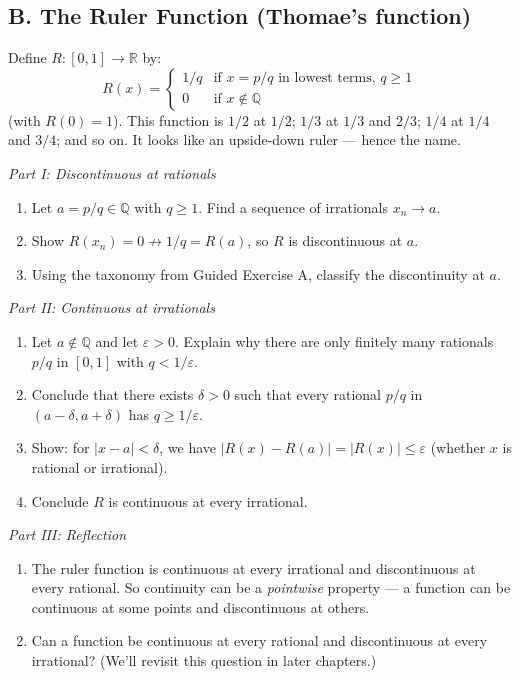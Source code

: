 \documentclass[
  10pt,
  letterpaper,
]{scrbook}
\newcommand{\QQ}{\mathbb{Q}}
\newcommand{\RR}{\mathbb{R}}
\begin{document}
\subsection{B. The Ruler Function (Thomae's
function)}\label{b.-the-ruler-function-thomaes-function}

Define \(R: [0,1] \to \RR\) by:
\[R(x) = \begin{cases} 1/q & \text{if } x = p/q \text{ in lowest terms, } q \geq 1 \\ 0 & \text{if } x \notin \QQ \end{cases}\]
(with \(R(0) = 1\)). This function is \(1/2\) at \(1/2\); \(1/3\) at
\(1/3\) and \(2/3\); \(1/4\) at \(1/4\) and \(3/4\); and so on. It looks
like an upside-down ruler --- hence the name.

\emph{Part I: Discontinuous at rationals}

\begin{enumerate}
\def\labelenumi{(\alph{enumi})}
\item
  Let \(a = p/q \in \QQ\) with \(q \geq 1\). Find a sequence of
  irrationals \(x_n \to a\).
\item
  Show \(R(x_n) = 0 \not\to 1/q = R(a)\), so \(R\) is discontinuous at
  \(a\).
\item
  Using the taxonomy from Guided Exercise A, classify the discontinuity
  at \(a\).
\end{enumerate}

\emph{Part II: Continuous at irrationals}

\begin{enumerate}
\def\labelenumi{(\alph{enumi})}
\setcounter{enumi}{3}
\item
  Let \(a \notin \QQ\) and let \(\varepsilon > 0\). Explain why there
  are only finitely many rationals \(p/q\) in \([0,1]\) with
  \(q < 1/\varepsilon\).
\item
  Conclude that there exists \(\delta > 0\) such that every rational
  \(p/q\) in \((a - \delta, a + \delta)\) has \(q \geq 1/\varepsilon\).
\item
  Show: for \(|x - a| < \delta\), we have
  \(|R(x) - R(a)| = |R(x)| \leq \varepsilon\) (whether \(x\) is rational
  or irrational).
\item
  Conclude \(R\) is continuous at every irrational.
\end{enumerate}

\emph{Part III: Reflection}

\begin{enumerate}
\def\labelenumi{(\alph{enumi})}
\setcounter{enumi}{7}
\item
  The ruler function is continuous at every irrational and discontinuous
  at every rational. So continuity can be a \emph{pointwise} property
  --- a function can be continuous at some points and discontinuous at
  others.
\item
  Can a function be continuous at every rational and discontinuous at
  every irrational? (We'll revisit this question in later chapters.)
\end{enumerate}
\end{document}
